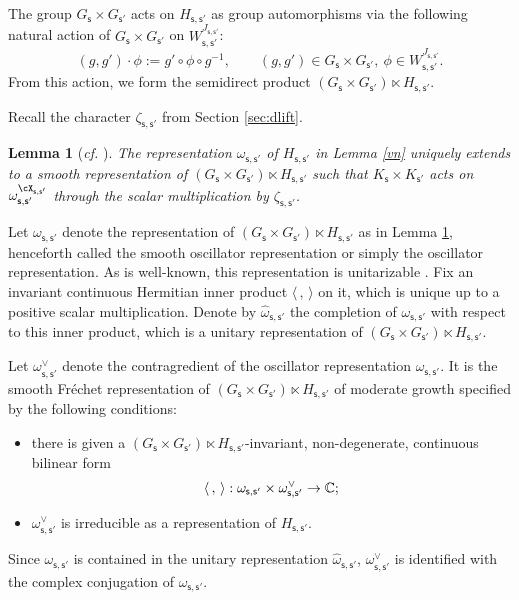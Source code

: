 \documentclass[12pt,a4paper]{amsart}
\newcommand{\la}{\langle}
\newcommand{\ra}{\rangle}
\numberwithin{equation}{section}
\newtheorem{lem}[thm]{Lemma}
\theoremstyle{remark}
\def\cf{\emph{cf.} }
\begin{document}
The group $G_{\mathsf s}\times G_{\mathsf s'}$ acts on $H_{\mathsf s, \mathsf s'}$ as group automorphisms via the following natural action of $G_{\mathsf s}\times G_{\mathsf s'}$ on  $W_{\mathsf s, \mathsf s'}^{J_{\mathsf s, \mathsf s'}}$:
\[
  (g, g')\cdot \phi:=g'\circ \phi\circ g^{-1}, \qquad (g,g')\in G_{\mathsf s}\times G_{\mathsf s'},\ \phi\in W_{\mathsf s, \mathsf s'}^{J_{\mathsf s, \mathsf s'}}.
\]
From this action, we form the semidirect product $(G_{\mathsf s}\times G_{\mathsf s'})\ltimes H_{\mathsf s, \mathsf s'}$.

Recall the character $\zeta_{\mathsf s, \mathsf s'}$ from Section \ref{sec:dlift}.

\begin{lem}[{\cf \cite[Proposition 7.5]{Ad07}}]\label{deforos}
The representation $\omega_{\mathsf s, \mathsf s'}$ of $H_{\mathsf s, \mathsf s'}$ in Lemma \ref{vn} uniquely extends to a  smooth representation of $(G_{\mathsf s}\times G_{\mathsf s'})\ltimes H_{\mathsf s, \mathsf s'}$ such  that $K_{\mathsf s}\times  K_{\mathsf s'}$ acts on  $ \omega_{\mathsf s, \mathsf s'}^{\cX_{\mathsf s, \mathsf s'}}$ through the scalar multiplication by $\zeta_{\mathsf s, \mathsf s'}$.
\end{lem}

Let $\omega_{\mathsf s, \mathsf s'}$ denote the representation of $(G_{\mathsf s}\times G_{\mathsf s'})\ltimes H_{\mathsf s, \mathsf s'}$ as in Lemma \ref{deforos}, henceforth called the smooth oscillator representation or simply the oscillator representation. As is well-known, this representation is unitarizable \cite{Weil}. Fix an invariant continuous Hermitian inner product $\la\,,\,\ra$ on it, which is unique up to a positive scalar multiplication.
Denote by $\hat \omega_{\mathsf s, \mathsf s'}$ the completion of $\omega_{\mathsf s, \mathsf s'}$ with respect to this inner product, which is a unitary representation of  $(G_{\mathsf s}\times G_{\mathsf s'})\ltimes H_{\mathsf s, \mathsf s'}$.

 Let $\omega_{\mathsf s, \mathsf s'}^\vee$ denote the  contragredient of the  oscillator  representation $\omega_{\mathsf s, \mathsf s'}$. It is  the smooth Fr\'echet representation of $(G_{\mathsf s}\times G_{\mathsf s'})\ltimes H_{\mathsf s, \mathsf s'}$ of moderate growth specified by the following conditions:
 \begin{itemize}
 \item there is given a  $(G_{\mathsf s}\times G_{\mathsf s'})\ltimes H_{\mathsf s, \mathsf s'}$-invariant, non-degenerate, continuous bilinear form
 \[
   \la\,,\,\ra:  \omega_{\mathsf s, \mathsf s'}\times \omega_{\mathsf s, \mathsf s'}^\vee\rightarrow \C;
 \]
 \item  $\omega_{\mathsf s, \mathsf s'}^\vee$  is irreducible as a representation of $H_{\mathsf s, \mathsf s'}$.
 \end{itemize}
Since $\omega_{\mathsf s, \mathsf s'}$ is contained in the unitary representation $\hat \omega_{\mathsf s, \mathsf s'}$, $\omega_{\mathsf s, \mathsf s'}^\vee$ is identified with the complex conjugation of $\omega_{\mathsf s, \mathsf s'}$.
\end{document}
